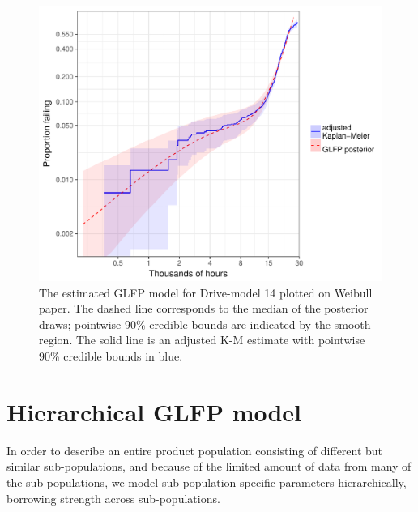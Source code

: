 \documentclass[11pt]{article}
\begin{document}
\begin{figure}[H]
\centering
  \includegraphics[width=.8\textwidth]{km14-prob-plus}
  \caption{\footnotesize The estimated GLFP model for Drive-model 14 plotted on Weibull paper.  The dashed line corresponds to the median of the posterior draws; pointwise 90\% credible bounds are indicated by the smooth region.  The solid line is an adjusted K-M estimate with pointwise 90\% credible bounds in blue.}
  \label{ex1-overlay}
\end{figure}


\section{Hierarchical GLFP model}
\label{sec:Hierarchical GLFP model}
In order to describe an entire product population consisting of different but similar sub-populations, and because of the limited amount of data from many of the sub-populations, we model sub-population-specific parameters hierarchically, borrowing strength across sub-populations.
\end{document}
